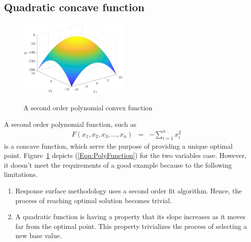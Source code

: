 \documentclass[twocolumn]{svjour3}          %
\begin{document}
\subsection{Quadratic concave function}
\begin{figure}
	\centering
	\includegraphics[width=0.48\textwidth]{images/poly-2-var}
	\label{Fig:TwoVariablePolynomial}
	\caption{A second order polynomial convex function}
\end{figure}
A second order polynomial function, such as
\begin{eqnarray}
F(x_1, x_2, x_3, \dots, x_n) &=& -\sum_{i=1}^{n}{x_i^2} \label{Eqn:PolyFunction}
\end{eqnarray}
is a concave function, which serve the purpose of providing a unique optimal point. Figure~\ref{Fig:TwoVariablePolynomial} depicts (\ref{Eqn:PolyFunction}) for the two variables case. However, it doesn't meet the requirements of a good example because to the following limitations.
\begin{enumerate}
	\item Response surface methodology uses a second order fit algorithm. Hence, the process of reaching optimal solution becomes trivial.
	\item A quadratic function is having a property that its slope increases as it moves far from the optimal point. This property trivializes the process of selecting a new base value.
\end{enumerate}
\end{document}
